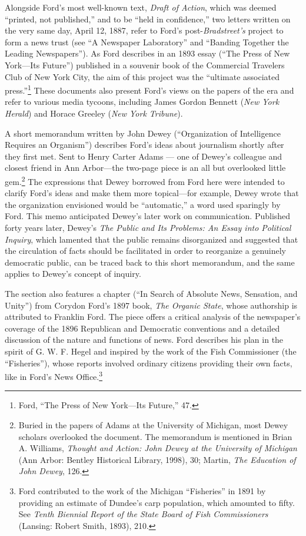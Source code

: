 \documentclass[openany,nobib]{tufte-book}
\begin{document}
Alongside Ford's most well-known text, \emph{Draft of Action}, which was
deemed ``printed, not published,'' and to be ``held in confidence,'' two
letters written on the very same day, April 12, 1887, refer to Ford's
post-\emph{Bradstreet's} project to form a news trust (see ``A Newspaper
Laboratory'' and ``Banding Together the Leading Newspapers''). As Ford
describes in an 1893 essay (``The Press of New York---Its Future'')
published in a souvenir book of the Commercial Travelers Club of New
York City, the aim of this project was the ``ultimate associated
press.''\footnote{Ford, ``The Press of New York---Its Future,'' 47.}
These documents also present Ford's views on the papers of the era and
refer to various media tycoons, including James Gordon Bennett
(\emph{New York Herald}) and Horace Greeley (\emph{New York Tribune}).

A short memorandum written by John Dewey (``Organization of Intelligence
Requires an Organism'') describes Ford's ideas about journalism shortly
after they first met. Sent to Henry Carter Adams --- one of Dewey's
colleague and closest friend in Ann Arbor---the two-page piece is an all
but overlooked little gem.\footnote{Buried in the papers of Adams at the
  University of Michigan, most Dewey scholars overlooked the document.
  The memorandum is mentioned in Brian A. Williams, \emph{Thought and
  Action: John Dewey at the University of Michigan} (Ann Arbor: Bentley
  Historical Library, 1998), 30; Martin, \emph{The Education of}
  \emph{John Dewey}, 126.} The expressions that Dewey borrowed from Ford
here were intended to clarify Ford's ideas and make them more
topical---for example, Dewey wrote that the organization envisioned
would be ``automatic,'' a word used sparingly by Ford. This memo
anticipated Dewey's later work on communication. Published forty years
later, Dewey's \emph{The Public and Its Problems: An Essay into
Political Inquiry}, which lamented that the public remains disorganized
and suggested that the circulation of facts should be facilitated in
order to reorganize a genuinely democratic public, can be traced back to
this short memorandum, and the same applies to Dewey's concept of
inquiry.

The section also features a chapter (``In Search of Absolute News,
Sensation, and Unity'') from Corydon Ford's 1897 book, \emph{The Organic
State}, whose authorship is attributed to Franklin Ford. The piece
offers a critical analysis of the newspaper's coverage of the 1896
Republican and Democratic conventions and a detailed discussion of the
nature and functions of news. Ford describes his plan in the spirit of
G. W. F. Hegel and inspired by the work of the Fish Commissioner (the
``Fisheries''), whose reports involved ordinary citizens providing their
own facts, like in Ford's News Office.\footnote{Ford contributed to the
  work of the Michigan ``Fisheries'' in 1891 by providing an estimate of
  Dundee's carp population, which amounted to fifty. See \emph{Tenth
  Biennial Report of the State Board of Fish Commissioners} (Lansing:
  Robert Smith, 1893), 210.}
\end{document}

